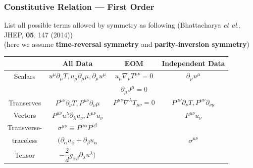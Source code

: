 \documentclass[10pt,aspectratio=43,xcolor=x11names,t]{beamer}%
\begin{document}
		\begin{frame}\frametitle{Constitutive Relation --- First Order}
			List all possible terms allowed by symmetry as following ({\scriptsize Bhattacharya \textit{et al.}, JHEP, \textbf{05}, 147 (2014)})\\
			(here we assume \textbf{time-reversal symmetry} and \textbf{parity-inversion symmetry})
			\begin{center}
				\begin{tabular}{c||c|c|c}
					& All Data & EOM & {\color{red}Independent Data}\\
					\hline\hline
					Scalars & $u^\mu \partial_\mu T, u_\mu \partial_\mu \mu, \partial_\mu u^\mu$ & $u_\mu\nabla_\nu T^{\mu\nu}=0$ & {\color{red}$\partial_\mu u^\mu$ }\\
					& & $\partial_\mu J^\mu=0$ & \\
					\hline
					Transerves & $P^{\mu\nu} \partial_\nu T, P^{\mu\nu}\partial_\nu\mu$ & $P^{\mu\nu}\nabla^\lambda T_{\mu\nu}=0$ & {\color{red}$P^{\mu\nu}\partial_\nu T, P^{\mu\nu}\partial_{\nu\mu}$}\\
					Vectors & $P^{\mu\nu}u^\lambda \partial_\lambda u_\nu, F^{\mu\nu}u_\nu$ & & {\color{red}$F^{\mu\nu}u_\nu$} \\
					\hline
					Transverse- & $\sigma^{\mu\nu}\equiv P^{\mu \alpha}P^{\nu\beta}$ & & \\
					traceless & $\bigg(\partial_\alpha u_\beta+\partial_\beta u_\alpha$ & &  {\color{red}$\sigma^{\mu\nu}$} \\
					Tensor & $-\dfrac{2}{d}g_{\alpha\beta}\partial_\lambda u^\lambda\bigg)$ & &
				\end{tabular}
			\end{center}
		\end{frame}
\end{document}
